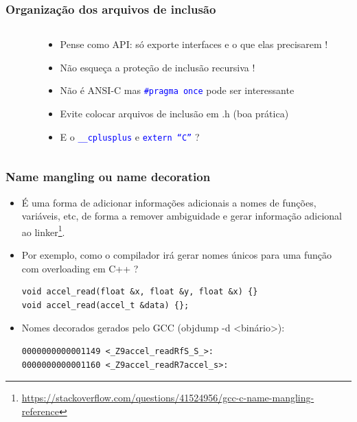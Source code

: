 \documentclass{beamer}
\begin{document}
\begin{frame}
	\frametitle{Organização dos arquivos de inclusão}
	\begin{columns}[T] %
		\begin{column}{.60\textwidth}
			
		\end{column}%
		\hfill%
		\begin{column}{.40\textwidth}
			\begin{itemize}
				\item Pense como API: só exporte interfaces e o que elas precisarem !
				\item Não esqueça a proteção de inclusão recursiva !
				\item Não é ANSI-C mas \texttt{\textcolor{blue}{\#pragma once}} pode ser interessante
				\item Evite colocar arquivos de inclusão em .h (boa prática)
                \item E o \texttt{\textcolor{blue}{\_\_cplusplus}} e \texttt{\textcolor{blue}{extern ``C''}} ?
			\end{itemize}
		\end{column}%
	\end{columns}
\end{frame}

\begin{frame}[fragile]
	\frametitle{Name mangling ou name decoration}
		\begin{itemize}
			\item É uma forma de adicionar informações adicionais a nomes de funções, variáveis, etc, de forma a remover ambiguidade e gerar informação adicional ao linker\footnote{{\tiny\url{ https://stackoverflow.com/questions/41524956/gcc-c-name-mangling-reference}}}.
			\item Por exemplo, como o compilador irá gerar nomes únicos para uma função com overloading em C++ ?
            	\begin{lstlisting}[style=customc]
void accel_read(float &x, float &y, float &x) {}
void accel_read(accel_t &data) {};
            	\end{lstlisting}
               \item Nomes decorados gerados pelo GCC (objdump -d <binário>):
            	\begin{lstlisting}[style=customc]
0000000000001149 <_Z9accel_readRfS_S_>:
0000000000001160 <_Z9accel_readR7accel_s>:
            	\end{lstlisting}
		\end{itemize}
\end{frame}
\end{document}
